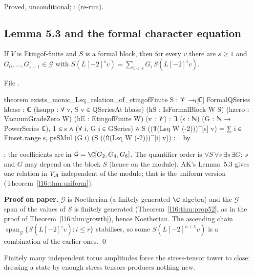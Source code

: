 \begin{status}
Proved, unconditional; : \lean{[propext, Classical.}\allowbreak{}\allowbreak\lean{sound]} (re-run).
\end{status}

\subsection{Lemma 5.3 and the formal character equation}

\begin{theorem}\label{l16:thm:lemma53}
If $V$ is Etingof-finite and $S$ is a formal block, then for every $v$ there are $s\ge1$ and $G_0,\dots,G_{s-1}\in\mathcal G$
with $S(L[-2]^sv) = \sum_{i<s}G_i\,S(L[-2]^iv)$.
\end{theorem}
\noindent File .
\begin{leancode}
theorem exists_monic_Lsq_relation_of_etingofFinite {S : 𝒱 →ₗ[ℂ] FormalQSeries} {hbase : ℂ}
    (hsupp : ∀ v, S v ∈ QSeriesAt hbase) (hS : IsFormalBlock W S)
    (hzero : VacuumGradeZero W) (hE : EtingofFinite W) (v : 𝒱) :
    ∃ (s : ℕ) (G : ℕ → PowerSeries ℂ), 1 ≤ s ∧ (∀ i, G i ∈ GSeries) ∧
      S ((⇑(Lsq W (-2)))^[s] v)
        = ∑ i ∈ Finset.range s, psSMul (G i) (S ((⇑(Lsq W (-2)))^[i] v)) := by
\end{leancode}

\begin{dictionary}
: the coefficients are in $\mathcal G = \C[G_2,G_4,G_6]$. The quantifier order is
$\forall S\,\forall v\,\exists s\,\exists G$: $s$ and $G$ may depend on the block $S$ (hence on the module). AK's
Lemma~5.3 gives one relation in $V_{\mathcal A}$ independent of the module; that is the uniform version
(Theorem~\ref{l16:thm:uniform}).
\end{dictionary}

\textbf{Proof on paper.} $\mathcal G$ is Noetherian (a finitely generated $\C$-algebra) and the $\mathcal G$-span of the
values of $S$ is finitely generated (Theorem~\ref{l16:thm:prop52}, as in the proof of Theorem~\ref{l16:thm:growth}),
hence Noetherian. The ascending chain $\operatorname{span}_{\mathcal G}\{S(L[-2]^iv): i\le r\}$ stabilises, so some
$S(L[-2]^{n+1}v)$ is a combination of the earlier ones. \qed

\begin{physics}
Finitely many independent torus amplitudes force the stress-tensor tower to close: dressing a state by enough stress
tensors produces nothing new.
\end{physics}

